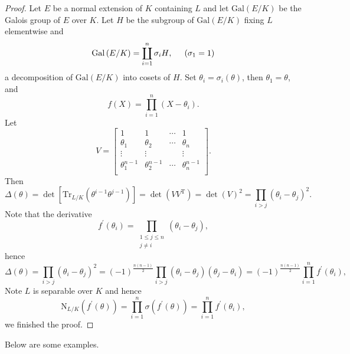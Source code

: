 \begin{proof}
Let $E$ be a normal extension of $K$ containing $L$ and let $\mathrm{Gal}(E/K)$ be the Galois group of $E$ over $K$. Let $H$ be the subgroup of $\mathrm{Gal}(E/K)$ fixing $L$ elementwise and 
$$
\mathrm{Gal}\left( E/K \right) =\coprod_{i=1}^n{\sigma _iH},\hspace{0.5cm}\left( \sigma _1=1 \right) 
$$
a decomposition of $\mathrm{Gal}(E/K)$ into cosets of $H$. Set $\theta_i=\sigma_i(\theta)$, then $\theta_1=\theta$, and 
$$
f\left( X \right) =\prod_{i=1}^n{\left( X-\theta _i \right)}.
$$
Let 
$$
V=\left[ \begin{matrix}
	1&		1&		\cdots&		1\\
	\theta _1&		\theta _2&		\cdots&		\theta _n\\
	\vdots&		\vdots&		&		\vdots\\
	\theta _{1}^{n-1}&		\theta _{2}^{n-1}&		\cdots&		\theta _{n}^{n-1}\\
\end{matrix} \right] .
$$
Then 
$$
\Delta \left( \theta \right) =\det \left[ \mathrm{Tr}_{L/K}\left( \theta ^{i-1}\theta ^{j-1} \right) \right] =\det \left( VV^{\mathrm{T}} \right) =\det \left( V \right) ^2=\prod_{i>j}{\left( \theta _i-\theta _j \right) ^2}.
$$
Note that the derivative 
$$
f^{\prime}\left( \theta_i \right) =\prod_{\substack{1\le j\le n \\ j\ne i}}{\left( \theta _i-\theta _j \right)},
$$
hence 
$$
\Delta \left( \theta \right) =\prod_{i>j}{\left( \theta _i-\theta _j \right) ^2}=\left( -1 \right) ^{\frac{n\left( n-1 \right)}{2}}\prod_{i>j}{\left( \theta _i-\theta _j \right) \left( \theta _j-\theta _i \right)}=\left( -1 \right) ^{\frac{n\left( n-1 \right)}{2}}\prod_{i=1}^n{f^{\prime}\left( \theta _i \right)},
$$
Note $L$ is separable over $K$ and hence 
$$
\mathrm{N}_{L/K}\left( f^{\prime}\left( \theta \right) \right) =\prod_{i=1}^n{\sigma \left( f^{\prime}\left( \theta \right) \right)}=\prod_{i=1}^n{f^{\prime}\left( \theta _i \right)},
$$
we finished the proof.
\end{proof}
Below are some examples.
